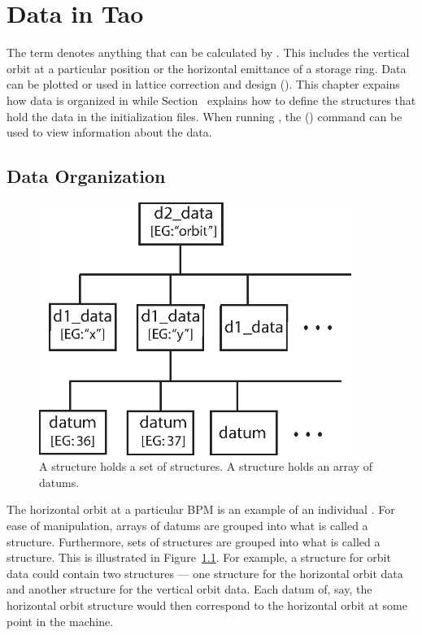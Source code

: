 \chapter{Data in Tao}
\label{c:data}

The term  denotes anything that can be calculated by
\tao. This includes the vertical orbit at a particular position or the
horizontal emittance of a storage ring. Data can be plotted or used in
lattice correction and design (). This chapter expains
how data is organized in \tao while Section~
explains how to define the structures that hold the data in the
initialization files. When running \tao, the 
() command can be used to view information about the
data.


\section{Data Organization}
\label{s:data-org}

\begin{figure}
  \centering
  \includegraphics[width=4in]{data-tree.eps}
  \caption[Data tree structure]
{A  structure holds a set of  structures. 
A  structure holds an array of datums.}
  \label{f:data-tree}
\end{figure}

The horizontal orbit at a particular BPM is an example of an
individual .  For ease of manipulation, arrays of datums are
grouped into what is called a  structure. Furthermore,
sets of  structures are grouped into what is called a
 structure.  This is illustrated in
Figure~\ref{f:data-tree}.  For example, a  structure for
orbit data could contain two  structures --- one
 structure for the horizontal orbit data and another
 structure for the vertical orbit data. Each datum of,
say, the horizontal orbit  structure would then correspond
to the horizontal orbit at some point in the machine.

